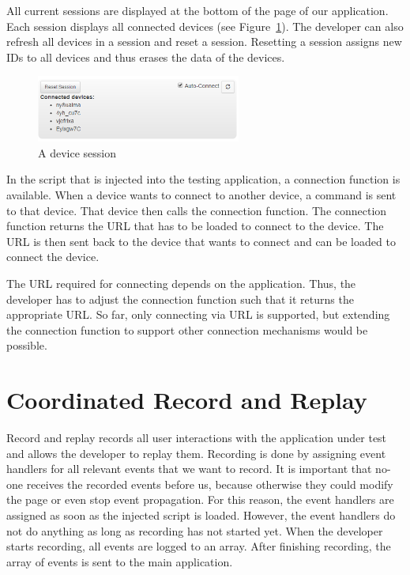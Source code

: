 All current sessions are displayed at the bottom of the page of our application. Each session displays all connected devices (see Figure~\ref{fig:sessions}). The developer can also refresh all devices in a session and reset a session. Resetting a session assigns new IDs to all devices and thus erases the data of the devices. 

\begin{figure}[H]
  \centering
    \includegraphics[width=0.6\textwidth]{images/screenshots/session_management.png}
	\caption[Screenshot: Session]{A device session}
	\label{fig:sessions}
\end{figure}

In the script that is injected into the testing application, a connection function is available. When a device wants to connect to another device, a command is sent to that device. That device then calls the connection function. The connection function returns the URL that has to be loaded to connect to the device. The URL is then sent back to the device that wants to connect and can be loaded to connect the device.

The URL required for connecting depends on the application. Thus, the developer has to adjust the connection function such that it returns the appropriate URL. So far, only connecting via URL is supported, but extending the connection function to support other connection mechanisms would be possible.

\section{Coordinated Record and Replay}

Record and replay records all user interactions with the application under test and allows the developer to replay them. Recording is done by assigning event handlers for all relevant events that we want to record. It is important that no-one receives the recorded events before us, because otherwise they could modify the page or even stop event propagation. For this reason, the event handlers are assigned as soon as the injected script is loaded. However, the event handlers do not do anything as long as recording has not started yet. When the developer starts recording, all events are logged to an array. After finishing recording, the array of events is sent to the main application. 

